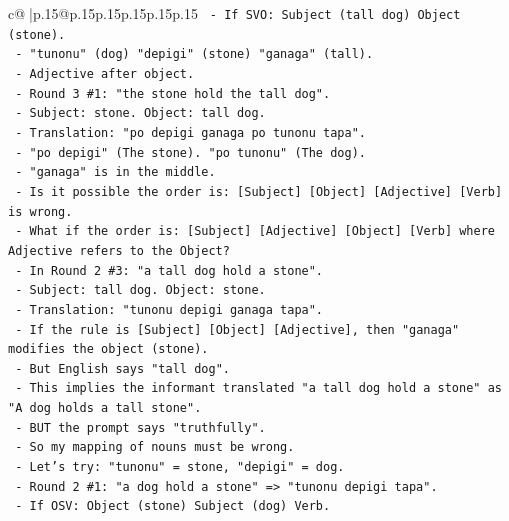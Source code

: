 \documentclass{article}
\begin{document}
{\begin{supertabular}{c@{$\;$}|p{.15\linewidth}@{}p{.15\linewidth}p{.15\linewidth}p{.15\linewidth}p{.15\linewidth}p{.15\linewidth}}
{{{\texttt{                {-} If SVO: Subject (tall dog) Object (stone).} \\
\texttt{                {-} "tunonu" (dog) "depigi" (stone) "ganaga" (tall).} \\
\texttt{                {-} Adjective after object.} \\
\texttt{              {-} Round 3 \#1: "the stone hold the tall dog".} \\
\texttt{                {-} Subject: stone. Object: tall dog.} \\
\texttt{                {-} Translation: "po depigi ganaga po tunonu tapa".} \\
\texttt{                {-} "po depigi" (The stone). "po tunonu" (The dog).} \\
\texttt{                {-} "ganaga" is in the middle.} \\
\texttt{                {-} Is it possible the order is: {[}Subject{]} {[}Object{]} {[}Adjective{]} {[}Verb{]} is wrong.} \\
\texttt{                {-} What if the order is: {[}Subject{]} {[}Adjective{]} {[}Object{]} {[}Verb{]} where Adjective refers to the Object?} \\
\texttt{                {-} In Round 2 \#3: "a tall dog hold a stone".} \\
\texttt{                {-} Subject: tall dog. Object: stone.} \\
\texttt{                {-} Translation: "tunonu depigi ganaga tapa".} \\
\texttt{                {-} If the rule is {[}Subject{]} {[}Object{]} {[}Adjective{]}, then "ganaga" modifies the object (stone).} \\
\texttt{                {-} But English says "tall dog".} \\
\texttt{                {-} This implies the informant translated "a tall dog hold a stone" as "A dog holds a tall stone".} \\
\texttt{                {-} BUT the prompt says "truthfully".} \\
\texttt{                {-} So my mapping of nouns must be wrong.} \\
\texttt{                {-} Let's try: "tunonu" = stone, "depigi" = dog.} \\
\texttt{                {-} Round 2 \#1: "a dog hold a stone" => "tunonu depigi tapa".} \\
\texttt{                  {-} If OSV: Object (stone) Subject (dog) Verb.} \\
}}}
\end{supertabular}}
\end{document}
